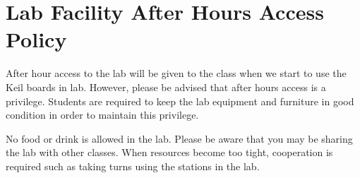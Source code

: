 \section*{Lab Facility After Hours Access Policy} 
After hour access to the lab will be given to the class 
when we start to use the Keil boards in lab. 
However, please be advised that after hours access is a privilege. 
Students are required to keep the lab equipment and furniture 
in good condition in order to maintain this privilege. 

No food or drink is allowed in the lab. 
Please be aware that you may be sharing the lab with other classes.  
When resources become too tight, cooperation is required 
such as taking turns using the stations in the lab. 		

